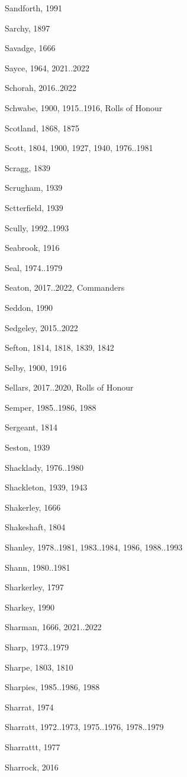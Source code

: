 {\begin{theindex}
\item Sandforth, 1991
\item Sarchy, 1897
\item Savadge, 1666
\item Sayce, 1964, 2021..2022
\item Schorah, 2016..2022
\item Schwabe, 1900, 1915..1916, Rolls of Honour
\item Scotland, 1868, 1875
\item Scott, 1804, 1900, 1927, 1940, 1976..1981
\item Scragg, 1839
\item Scrugham, 1939
\item Sctterfield, 1939
\item Scully, 1992..1993
\item Seabrook, 1916
\item Seal, 1974..1979
\item Seaton, 2017..2022, Commanders
\item Seddon, 1990
\item Sedgeley, 2015..2022
\item Sefton, 1814, 1818, 1839, 1842
\item Selby, 1900, 1916
\item Sellars, 2017..2020, Rolls of Honour
\item Semper, 1985..1986, 1988
\item Sergeant, 1814
\item Seston, 1939
\item Shacklady, 1976..1980
\item Shackleton, 1939, 1943
\item Shakerley, 1666
\item Shakeshaft, 1804
\item Shanley, 1978..1981, 1983..1984, 1986, 1988..1993
\item Shann, 1980..1981
\item Sharkerley, 1797
\item Sharkey, 1990
\item Sharman, 1666, 2021..2022
\item Sharp, 1973..1979
\item Sharpe, 1803, 1810
\item Sharpies, 1985..1986, 1988
\item Sharrat, 1974
\item Sharratt, 1972..1973, 1975..1976, 1978..1979
\item Sharrattt, 1977
\item Sharrock, 2016

\end{theindex}}
